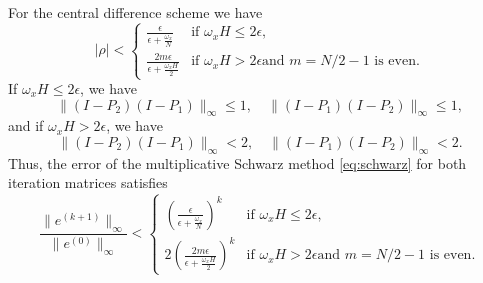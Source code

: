 \begin{thm}\label{thm:central_conv}
For the central difference scheme we have
%
\begin{equation}\label{eq:1D:bound2}
|\rho|  <
\begin{cases}
\frac{\epsilon}{\epsilon +\frac{\omega_x}{N}}  & \mbox{if $\omega_x H\leq 2\epsilon$,} \\
\frac{2m\epsilon}{\epsilon+\frac{\omega_x H}{2}} & \mbox{if $\omega_x H > 2\epsilon$
and $m=N/2-1$ is even.}
\end{cases}
\end{equation}
%
If $\omega_x H \leq 2\epsilon$, we have
%
\begin{equation*}%
\| (I-P_2)(I-P_1) \|_\infty \leq 1,\quad
\| (I-P_1)(I-P_2) \|_\infty \leq 1,
\end{equation*}
%
and if $\omega_x H > 2\epsilon$, we have
%
\begin{equation*}%
\| (I-P_2)(I-P_1) \|_\infty < 2,\quad
\| (I-P_1)(I-P_2) \|_\infty < 2.
\end{equation*}
%
Thus, the error of the multiplicative Schwarz method \eqref{eq:schwarz} for
both iteration matrices satisfies
%
$$\frac{\|e^{(k+1)}\|_\infty}{\|e^{(0)}\|_\infty}<
\begin{cases}
\left(\frac{\epsilon}{\epsilon +\frac{\omega_x}{N}}\right)^k
 &\mbox{if $\omega_x H\leq 2\epsilon$,} \\
2\left(\frac{2m\epsilon}{\epsilon+\frac{\omega_x H}{2}}\right)^k
 &\mbox{if $\omega_x H > 2\epsilon$
and $m=N/2-1$ is even.}
\end{cases}$$
%
\end{thm}

